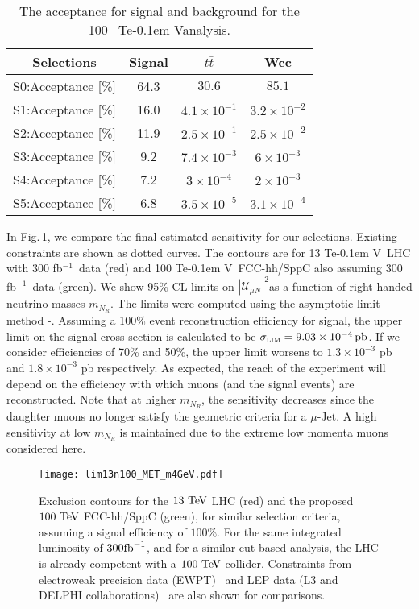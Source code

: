 \documentclass[reprint,doublecolumn,secnumarabic,amssymb, amsmath, aps,nofootinbib,superscriptaddress]{revtex4-1}
\newcommand{\Fig}[1]{Fig.\,\ref{#1}}
\newcommand{\Cit}[1]{~\cite{#1}}
\def\TeV{\ifmmode {\mathrm{\ Te\kern -0.1em V}}\else
                   \textrm{Te\kern -0.1em V}\fi}%
\def\ifb{\mbox{fb$^{-1}$}}%
\newcommand{\mix}{\ensuremath{|\mathcal{U}_{\mu N}|^{2}}}
\newcommand{\ttbar}{\ensuremath{t\bar{t}}}
\begin{document}
\begin{table}[h]
\caption{ The acceptance for signal and background for the 100~\TeV analysis. \label{sensEvt100}}
\begin{center}
\begin{tabular}{c  c  c  c }
  \hline \hline
   Selections & Signal & $\ttbar$ & Wcc  \\
  \hline
   S0:Acceptance [\%] & 64.3 & $30.6$ & $85.1$ \\
   S1:Acceptance [\%] & 16.0 & $4.1\times 10^{-1}$ & $3.2\times 10^{-2}$ \\
   S2:Acceptance [\%] & 11.9 & $2.5\times 10^{-1}$ & $2.5\times 10^{-2}$ \\
   S3:Acceptance [\%] & 9.2 & $7.4\times 10^{-3}$ & $6\times 10^{-3}$  \\
   S4:Acceptance [\%]  & 7.2 & $3\times 10^{-4}$ & $2\times 10^{-3}$  \\
   S5:Acceptance [\%]  & 6.8 & $3.5\times 10^{-5}$ & $3.1\times 10^{-4}$  \\  
  \hline
\hline
\end{tabular}
\end{center}
\end{table}        





In \Fig{excl13n100}, we compare the final estimated sensitivity for our selections. Existing constraints are shown as dotted curves. The contours are for 13 \TeV\ LHC with 300 \ifb\ data (red)
and 100 \TeV\ FCC-hh/SppC also assuming 300 \ifb\ data (green). We show 95\% CL limits on \mix as a function of right-handed neutrino masses $m_{N_R}$. The limits were computed using the
asymptotic limit method \cite{Junk:1999kv}-\cite{CMS-NOTE-2011-005}.  Assuming a 100\% event reconstruction
efficiency for signal, the upper limit on the signal cross-section is calculated to be $\sigma_{\text{\tiny{LIM}}}= 9.03\times 10^{-4} \,\rm{pb}$. If we consider efficiencies of 70\% and 50\%, the
upper limit worsens to $1.3\times 10^{-3}$ pb and $1.8\times 10^{-3}$ pb respectively. As expected, the reach of the experiment will depend on the efficiency with which muons (and the signal events) are reconstructed. Note that at
higher $m_{N_R}$, the sensitivity decreases since the daughter muons no longer satisfy the geometric criteria for a $\mu\text{-Jet}$. A high sensitivity at low $m_{N_R}$ is maintained due to the extreme low momenta muons considered here.


\begin{figure}
  \centering
   \texttt{[image: lim13n100\_MET\_m4GeV.pdf]}
  \caption{Exclusion contours for the $13 \TeV$ LHC (red) and the proposed $100\TeV$ FCC-hh/SppC (green), for similar selection criteria, assuming a signal efficiency of $100\%$. For the same integrated luminosity of $300\rm{fb}^{-1}$, and for a similar cut based analysis, the LHC is already competent with a $100\TeV$ collider. Constraints from electroweak precision data (EWPT)\Cit{delAguila:2008pw, Akhmedov:2013hec, Basso:2013jka, Blas:2013ana, Antusch:2015mia} and LEP data (L3 and DELPHI collaborations)\Cit{Adriani:1992pq,Abreu:1996pa} are also shown for comparisons.}
  \label{excl13n100}  
\end{figure}    
	
\end{document}
